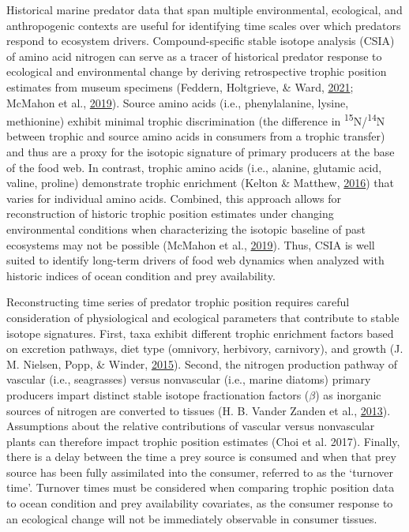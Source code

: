 \documentclass [11pt, proquest] {uwthesis}[2015/03/03]
\begin{document}
Historical marine predator data that span multiple environmental,
ecological, and anthropogenic contexts are useful for identifying time
scales over which predators respond to ecosystem drivers.
Compound-specific stable isotope analysis (CSIA) of amino acid nitrogen
can serve as a tracer of historical predator response to ecological and
environmental change by deriving retrospective trophic position
estimates from museum specimens (Feddern, Holtgrieve, \& Ward,
\protect\hyperlink{ref-Feddern2021}{2021}; McMahon et al.,
\protect\hyperlink{ref-McMahon2019}{2019}). Source amino acids (i.e.,
phenylalanine, lysine, methionine) exhibit minimal trophic
discrimination (the difference in
\textsuperscript{15}N/\textsuperscript{14}N between trophic and source
amino acids in consumers from a trophic transfer) and thus are a proxy
for the isotopic signature of primary producers at the base of the food
web. In contrast, trophic amino acids (i.e., alanine, glutamic acid,
valine, proline) demonstrate trophic enrichment (Kelton \& Matthew,
\protect\hyperlink{ref-McMahon2016}{2016}) that varies for individual
amino acids. Combined, this approach allows for reconstruction of
historic trophic position estimates under changing environmental
conditions when characterizing the isotopic baseline of past ecosystems
may not be possible (McMahon et al.,
\protect\hyperlink{ref-McMahon2019}{2019}). Thus, CSIA is well suited to
identify long-term drivers of food web dynamics when analyzed with
historic indices of ocean condition and prey availability.

Reconstructing time series of predator trophic position requires careful
consideration of physiological and ecological parameters that contribute
to stable isotope signatures. First, taxa exhibit different trophic
enrichment factors based on excretion pathways, diet type (omnivory,
herbivory, carnivory), and growth (J. M. Nielsen, Popp, \& Winder,
\protect\hyperlink{ref-Nielsen2015}{2015}). Second, the nitrogen
production pathway of vascular (i.e., seagrasses) versus nonvascular
(i.e., marine diatoms) primary producers impart distinct stable isotope
fractionation factors (\(\beta\)) as inorganic sources of nitrogen are
converted to tissues (H. B. Vander Zanden et al.,
\protect\hyperlink{ref-VanderZanden2013}{2013}). Assumptions about the
relative contributions of vascular versus nonvascular plants can
therefore impact trophic position estimates (Choi et al. 2017). Finally,
there is a delay between the time a prey source is consumed and when
that prey source has been fully assimilated into the consumer, referred
to as the `turnover time'. Turnover times must be considered when
comparing trophic position data to ocean condition and prey availability
covariates, as the consumer response to an ecological change will not be
immediately observable in consumer tissues.
\end{document}
